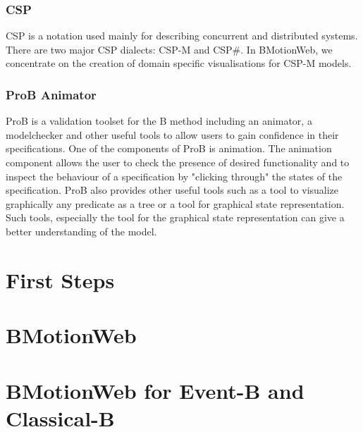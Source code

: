 \documentclass[twoside,10pt]{book}
\begin{document}
\subsection{CSP}
\label{csp}

CSP is a notation used mainly for describing concurrent and distributed systems.
There are two major CSP dialects: CSP-M and CSP\#.
In BMotionWeb, we concentrate on the creation of domain specific visualisations for CSP-M models.

\subsection{ProB Animator}
\label{prob_animator}

ProB is a validation toolset for the B method including an animator, a modelchecker and other useful tools to allow users to gain confidence in their specifications. One of the components of ProB is animation. The animation component allows the user to check the presence of desired functionality and to inspect the behaviour of a specification by "clicking through" the states of the specification. ProB also provides other useful tools such as a tool to visualize graphically any predicate as a tree or a tool for graphical state representation. Such tools, especially the tool for the graphical state representation can give a better understanding of the model.

\chapter{First Steps}
\label{first_steps}


\chapter{BMotionWeb}
\label{bms}


\chapter{BMotionWeb for Event-B and Classical-B}
\label{bms4b}


%



\clearpage
{}
{}
\printindex
\end{document}

